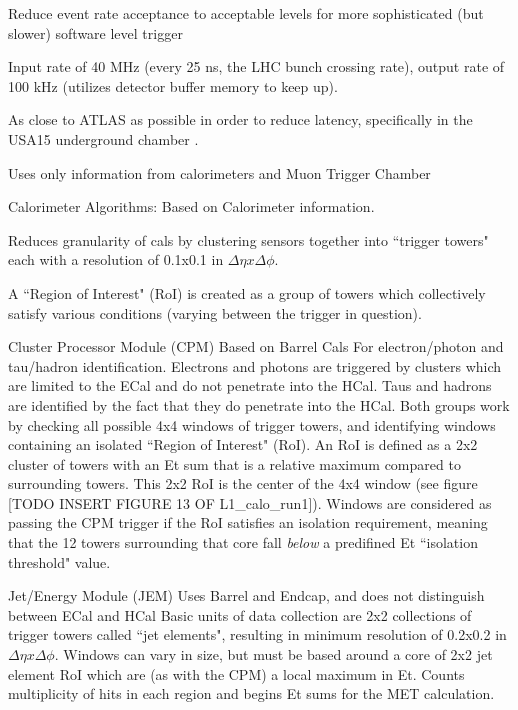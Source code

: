 Reduce event rate acceptance to acceptable levels for more sophisticated (but slower) software level trigger

Input rate of 40 MHz (every 25 ns, the LHC bunch crossing rate), output rate of 100 kHz (utilizes detector buffer memory to keep up). \cite{trigger_run2}

As close to ATLAS as possible in order to reduce latency, specifically in the USA15 underground chamber \cite{trigger_tdr}.


Uses only information from calorimeters and Muon Trigger Chamber


Calorimeter Algorithms: \cite{L1_calo_run1}
    Based on Calorimeter information.

    Reduces granularity of cals by clustering sensors together into ``trigger towers" each with a resolution of 0.1x0.1 in $\Delta \eta x \Delta \phi$.

    A ``Region of Interest" (RoI) is created as a group of towers which collectively satisfy various conditions (varying between the trigger in question).

    Cluster Processor Module (CPM)
        Based on Barrel Cals
        For electron/photon and tau/hadron identification.
        Electrons and photons are triggered by clusters which are limited to the ECal and do not penetrate into the HCal.
        Taus and hadrons are identified by the fact that they do penetrate into the HCal.
        Both groups work by checking all possible 4x4 windows of trigger towers, and identifying windows containing an isolated ``Region of Interest" (RoI).
        An RoI is defined as a 2x2 cluster of towers with an Et sum that is a relative maximum compared to surrounding towers.
        This 2x2 RoI is the center of the 4x4 window (see figure [TODO INSERT FIGURE 13 OF L1_calo_run1]).
        Windows are considered as passing the CPM trigger if the RoI satisfies an isolation requirement, meaning that the 12 towers surrounding that core fall \textit{below} a predifined Et ``isolation threshold" value.

    Jet/Energy Module (JEM)
        Uses Barrel and Endcap, and does not distinguish between ECal and HCal
        Basic units of data collection are 2x2 collections of trigger towers called ``jet elements", resulting in minimum resolution of 0.2x0.2 in $\Delta \eta x \Delta \phi$.
        Windows can vary in size, but must be based around a core of 2x2 jet element RoI which are (as with the CPM) a local maximum in Et.
        Counts multiplicity of hits in each region and begins Et sums for the MET calculation.
        
